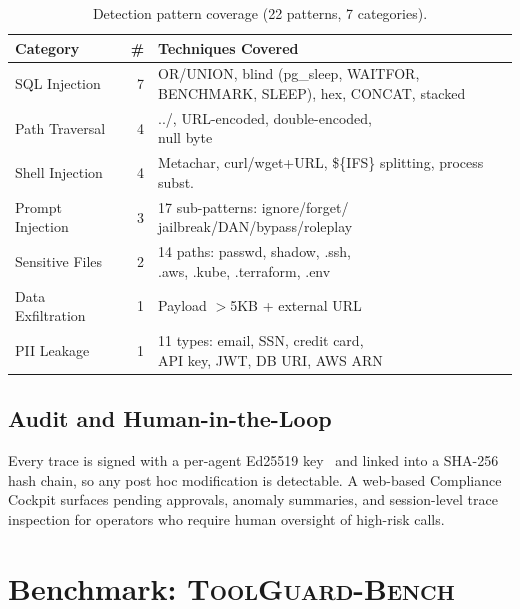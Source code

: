 \documentclass{article}
\newcommand{\bench}{\textsc{ToolGuard-Bench}\xspace}
\begin{document}
\begin{table}[t]
\centering
\footnotesize
\caption{Detection pattern coverage (22 patterns, 7 categories).}
\vspace{-0.1in}
\label{tab:patterns}
\setlength{\tabcolsep}{2.5pt}
\begin{tabular}{lrl}
\toprule
\textbf{Category} & \textbf{\#} & \textbf{Techniques Covered} \\
\midrule
SQL Injection       & 7 & \makecell[tl]{OR/UNION, blind (pg\_sleep, WAITFOR,\\BENCHMARK, SLEEP), hex, CONCAT, stacked} \\
Path Traversal      & 4 & \makecell[tl]{../, URL-encoded, double-encoded,\\null byte} \\
Shell Injection     & 4 & \makecell[tl]{Metachar, curl/wget+URL,\\\$\{IFS\} splitting, process subst.} \\
Prompt Injection    & 3 & \makecell[tl]{17 sub-patterns: ignore/forget/\\jailbreak/DAN/bypass/roleplay} \\
Sensitive Files     & 2 & \makecell[tl]{14 paths: passwd, shadow, .ssh,\\.aws, .kube, .terraform, .env} \\
Data Exfiltration   & 1 & Payload $>$5KB + external URL \\
PII Leakage         & 1 & \makecell[tl]{11 types: email, SSN, credit card,\\API key, JWT, DB URI, AWS ARN} \\
\bottomrule
\end{tabular}
\vspace{-0.15in}
\end{table}

\subsection{Audit and Human-in-the-Loop}

Every trace is signed with a per-agent Ed25519 key~\citep{bernstein2012eddsa} and linked into a SHA-256 hash chain, so any post hoc modification is detectable.
A web-based Compliance Cockpit surfaces pending approvals, anomaly summaries, and session-level trace inspection for operators who require human oversight of high-risk calls.

\section{Benchmark: \bench}
\label{sec:bench}
\end{document}
